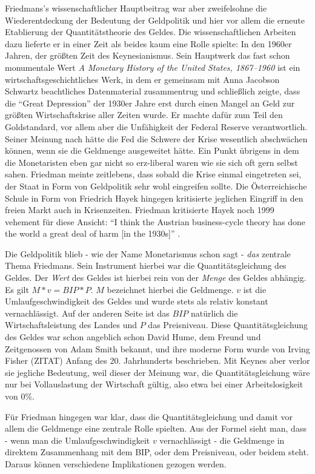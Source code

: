 Friedmans's wissenschaftlicher Hauptbeitrag war aber zweifelsohne die Wiederentdeckung der Bedeutung der Geldpolitik und hier vor allem die erneute Etablierung der Quantitätstheorie des Geldes. Die wissenschaftlichen Arbeiten dazu lieferte er in einer Zeit als beides kaum eine Rolle spielte: In den 1960er Jahren, der größten Zeit des Keynesianismus. Sein Hauptwerk das fast schon monumentale Wert \textit{A Monetary History of the United States, 1867–1960} ist ein wirtschaftsgeschichtliches Werk, in dem er gemeinsam mit Anna Jacobson Schwartz beachtliches Datenmaterial zusammentrug und schließlich zeigte, dass die "`Great Depression"' der 1930er Jahre erst durch einen Mangel an Geld zur größten Wirtschaftskrise aller Zeiten wurde. Er machte dafür zum Teil den Goldstandard, vor allem aber die Unfähigkeit der Federal Reserve verantwortlich. Seiner Meinung nach hätte die Fed die Schwere der Krise wesentlich abschwächen können, wenn sie die Geldmenge ausgeweitet hätte. Ein Punkt übrigens in dem die Monetaristen eben gar nicht so erz-liberal waren wie sie sich oft gern selbst sahen. Friedman meinte zeitlebens, dass sobald die Krise einmal eingetreten sei, der Staat in Form von Geldpolitik sehr wohl eingreifen sollte. Die Österreichische Schule in Form von Friedrich Hayek hingegen kritisierte jeglichen Eingriff in den freien Markt auch in Krisenzeiten. Friedman kritisierte Hayek noch 1999 vehement für diese Ansicht: "`I think the Austrian business-cycle theory has done the world a great deal of harm [in the 1930s]"' \parencite{Epstein1999}.

Die Geldpolitik blieb - wie der Name Monetarismus schon sagt - \textit{das} zentrale Thema Friedmans. Sein Instrument hierbei war die Quantitätsgleichung des Geldes. Der \textit{Wert} des Geldes ist hierbei rein von der \textit{Menge} des Geldes abhängig. Es gilt $ M * v = BIP * P$. $M$ bezeichnet hierbei die Geldmenge. $v$ ist die Umlaufgeschwindigkeit des Geldes und wurde stets als relativ konstant vernachlässigt. Auf der anderen Seite ist das $BIP$ natürlich die Wirtschaftsleistung des Landes und $P$ das Preisniveau. Diese Quantitätsgleichung des Geldes war schon angeblich schon David Hume, dem Freund und Zeitgenossen von Adam Smith bekannt, und ihre moderne Form wurde von Irving Fisher (ZITAT) Anfang des 20. Jahrhunderts beschrieben. Mit Keynes aber verlor sie jegliche Bedeutung, weil dieser der Meinung war, die Quantitätsgleichung wäre nur bei Vollauslastung der Wirtschaft gültig, also etwa bei einer Arbeitslosigkeit von 0\%.

Für Friedman hingegen war klar, dass die Quantitätsgleichung und damit vor allem die Geldmenge eine zentrale Rolle spielten. Aus der Formel sieht man, dass - wenn man die Umlaufgeschwindigkeit $v$ vernachlässigt - die Geldmenge in direktem Zusammenhang mit dem BIP, oder dem Preisniveau, oder beidem steht. Daraus können verschiedene Implikationen gezogen werden. 

